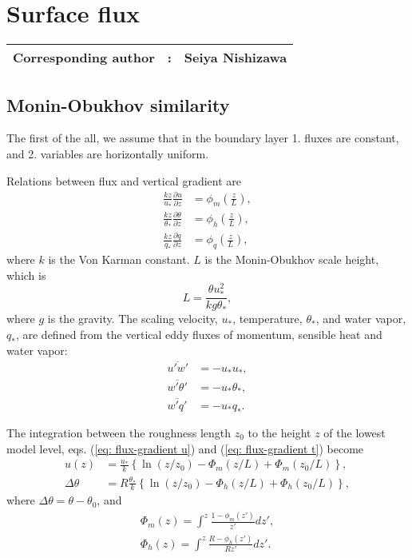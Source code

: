 \section{Surface flux}
{\bf \Large 
\begin{tabular}{ccc}
\hline
  Corresponding author & : & Seiya Nishizawa\\
\hline
\end{tabular}
}


\subsection{Monin-Obukhov similarity}
The first of the all,
we assume that in the boundary layer
1. fluxes are constant,
and 2. variables are horizontally uniform.


Relations between flux and vertical gradient are
\begin{align}
  \frac{kz}{u_*} \frac{\partial u}{\partial z} &= \phi_m\left(\frac{z}{L}\right), \label{eq: flux-gradient u} \\
  \frac{kz}{\theta_*} \frac{\partial \theta}{\partial z} &= \phi_h\left(\frac{z}{L}\right), \label{eq: flux-gradient t} \\
  \frac{kz}{q_*} \frac{\partial q}{\partial z} &= \phi_q\left(\frac{z}{L}\right),
\end{align}
where $k$ is the Von Karman constant.
$L$ is the Monin-Obukhov scale height, which is
\begin{equation}
  L = \frac{\theta u_*^2}{kg\theta_*},
\end{equation}
where $g$ is the gravity.
The scaling velocity, $u_*$, temperature, $\theta_*$,
and water vapor, $q_*$, are defined
from the vertical eddy fluxes of momentum, sensible heat and water vapor:
\begin{align}
  \overline{u'w'} &= -u_*u_*, \\
  \overline{w'\theta'} &= - u_*\theta_*, \\
  \overline{w'q'} &= - u_*q_*.
\end{align}

The integration between the roughness length $z_0$ to the height $z$ of the lowest model level, eqs. (\ref{eq: flux-gradient u}) and (\ref{eq: flux-gradient t}) become
\begin{align}
  u(z) &= \frac{u_*}{k} \left\{\ln(z/z_0)-\Phi_m(z/L)+\Phi_m(z_0/L)\right\}, \\
  \Delta\theta &= R\frac{\theta_*}{k} \left\{\ln(z/z_0)-\Phi_h(z/L)+\Phi_h(z_0/L)\right\},
\end{align}
where $\Delta\theta = \theta-\theta_0$,
and
\begin{align}
  \Phi_m(z) = \int^z \frac{1-\phi_m(z')}{z'} dz', \\
  \Phi_h(z) = \int^z \frac{R-\phi_h(z')}{R z'} dz'.
\end{align}


